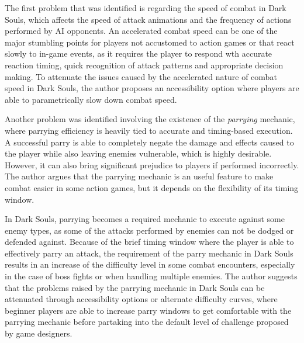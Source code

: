 The first problem that was identified is regarding the speed of combat in Dark Souls, which affects the speed of attack animations and the frequency of actions performed by AI opponents. An accelerated combat speed can be one of the major stumbling points for players not accustomed to action games or that react slowly to in-game events, as it requires the player to respond wth accurate reaction timing, quick recognition of attack patterns and appropriate decision making. To attenuate the issues caused by the accelerated nature of combat speed in Dark Souls, the author proposes an accessibility option where players are able to parametrically slow down combat speed.

Another problem was identified involving the existence of the \emph{parrying} mechanic, where parrying efficiency is heavily tied to accurate and timing-based execution. A successful parry is able to completely negate the damage and effects caused to the player while also leaving enemies vulnerable, which is highly desirable. However, it can also bring significant prejudice to players if performed incorrectly. The author argues that the parrying mechanic is an useful feature to make combat easier in some action games, but it depends on the flexibility of its timing window.

In Dark Souls, parrying becomes a required mechanic to execute against some enemy types, as some of the attacks performed by enemies can not be dodged or defended against. Because of the brief timing window where the player is able to effectively parry an attack, the requirement of the parry mechanic in Dark Souls results in an increase of the difficulty level in some combat encounters, especially in the case of boss fights or when handling multiple enemies. The author suggests that the problems raised by the parrying mechanic in Dark Souls can be attenuated through accessibility options or alternate difficulty curves, where beginner players are able to increase parry windows to get comfortable with the parrying mechanic before partaking into the default level of challenge proposed by game designers.

